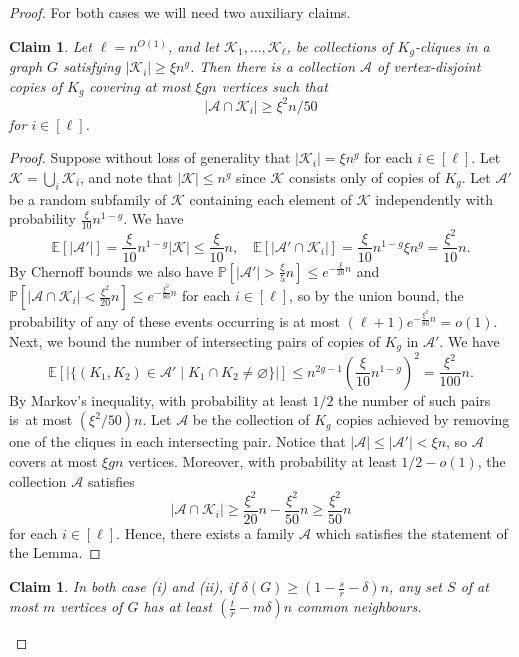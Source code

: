 \documentclass[reqno, 12pt]{amsart}
\numberwithin{equation}{section}
\numberwithin{figure}{section}
\theoremstyle{plain}
\newtheorem{claim}[thm]{Claim}
\theoremstyle{definition}
\def\cA{{\mathcal A}}
\def\cK{{\mathcal K}}
\newcommand{\pr}[1]{\mathbb{P} \left[ #1 \right]}
\newcommand{\E}{\mathbb{E} }
\def \absorber{\cA}
\let\emptyset=\varnothing
\begin{document}
    \begin{proof}
        For both cases we will need two auxiliary claims.
        \begin{claim}\label{c:absorber_abstract_claim}
            Let $\ell = n^{O(1)}$, and let $\cK_1, \ldots, \cK_\ell$, be collections of $K_{g}$-cliques in a graph $G$ satisfying $|\cK_i| \geq \xi n^{g}$. Then there is a collection $\absorber$ of vertex-disjoint copies of $K_g$ covering at most $\xi g n$ vertices such that 
            $$|\cA \cap \cK_i| \geq \xi^2 n/50$$
            for $i \in [\ell]$.
        \end{claim}

        \begin{proof}            
            Suppose without loss of generality that $|\cK_i|=\xi n^{g}$ for each $i\in[\ell]$. Let $\cK=\bigcup_i \cK_i$, and note that $|\cK|\leq n^g$ since $\cK$ consists only of copies of $K_g$. Let $\cA'$ be a random subfamily of $\cK$ containing each element of $\cK$ independently with probability $\frac{\xi}{10}n^{1-g}$. We have \[\E[|\cA'|]=\frac{\xi}{10}n^{1-g}|\cK|\leq \frac{\xi}{10}n, \quad \E[|\cA'\cap \cK_i|]=\frac{\xi}{10}n^{1-g}\xi n^g=\frac{\xi^2}{10}n.\] By Chernoff bounds we also have $\pr {|\cA'| >\frac{\xi}{5}n}\leq e^{-\frac{\xi}{20}n}$ and $\pr{|\cA\cap \cK_i|< \frac{\xi^2}{20}n}\leq e^{-\frac{\xi^2}{80}n}$ for each $i\in [\ell]$, so by the union bound, the probability of any of these events occurring is at most $(\ell+1) e^{-\frac{\xi^2}{80}n}=o(1)$. Next, we bound the number of intersecting pairs of copies of $K_g$ in $\cA'$. We have 
            \[\E[|\{(K_1,K_2)\in \cA' \mid K_1\cap K_2\neq \emptyset\}|]\leq n^{2g-1}\left(\frac{\xi}{10}n^{1-g}\right)^2=\frac{\xi^2}{100}n.\]
            By Markov's inequality, with probability at least $1/2$ the number of such pairs is~at most $\left(\xi^2/50\right)n$. Let $\cA$ be the collection of $K_g$ copies achieved by removing one of the cliques in each intersecting pair. Notice that $|\absorber|\leq |\absorber'|< \xi n$, so $\absorber$ covers at most $\xi g n$ vertices. Moreover, with probability at least $1/2-o(1)$, the collection $\cA$ satisfies \[|\cA \cap \cK_i|\geq \frac{\xi^2}{20}n-\frac{\xi^2}{50}n\geq \frac{\xi^2}{50}n\] for each $i\in[\ell]$. Hence, there exists a family $\cA$ which satisfies the statement of the Lemma.
        \end{proof}
        \begin{claim}\label{c:many_common_neighbours_(i)}
            In both case (i) and (ii), if $\delta(G)\geq \left(1-\frac sr -\delta\right)n$, any set $S$ of at most $m$ vertices of $G$ has at least $\left(\frac{t}{r}-m\delta\right)n$ common neighbours.
        \end{claim}
            

\end{proof}
\end{document}
